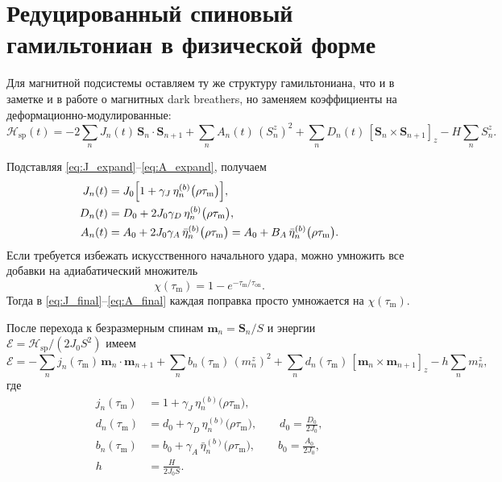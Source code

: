 \documentclass[12pt,a4paper]{article}
\newcommand{\E}{\mathcal{E}}
\newcommand{\Hsp}{\mathcal{H}_{\mathrm{sp}}}
\newcommand{\m}{\bm{m}}
\newcommand{\tm}{\tau_{\mathrm{m}}}
\begin{document}
\section{Редуцированный спиновый гамильтониан в физической форме}
Для магнитной подсистемы оставляем ту же структуру гамильтониана, что и в заметке и в работе о магнитных dark breathers, но заменяем коэффициенты на деформационно-модулированные:
\begin{equation}
\Hsp(t)= -2\sum_n J_n(t)\,\bm S_n\cdot\bm S_{n+1}
+ \sum_n A_n(t)\,(S_n^z)^2
+ \sum_n D_n(t)\,[\bm S_n\times \bm S_{n+1}]_z
- H\sum_n S_n^z.
\label{eq:Hspin_physical}
\end{equation}

Подставляя \eqref{eq:J_expand}--\eqref{eq:A_expand}, получаем
\begin{align}
J_n(t) &= J_0\Bigl[1+\gamma_J\,\eta_n^{(b)}\bigl(\rho\tm\bigr)\Bigr],
\label{eq:J_final}\\
D_n(t) &= D_0 + 2J_0\gamma_D\,\eta_n^{(b)}\bigl(\rho\tm\bigr),
\label{eq:D_final}\\
A_n(t) &= A_0 + 2J_0\gamma_A\,\bar\eta_n^{(b)}\bigl(\rho\tm\bigr)
= A_0 + B_A\,\bar\eta_n^{(b)}\bigl(\rho\tm\bigr).
\label{eq:A_final}
\end{align}
Если требуется избежать искусственного начального удара, можно умножить все добавки на адиабатический множитель
\begin{equation}
\chi(\tm)=1-e^{-\tm/\tau_{\mathrm{on}}}.
\end{equation}
Тогда в \eqref{eq:J_final}--\eqref{eq:A_final} каждая поправка просто умножается на $\chi(\tm)$.

После перехода к безразмерным спинам $\m_n=\bm S_n/S$ и энергии $\E=\Hsp/(2J_0S^2)$ имеем
\begin{equation}
\E = -\sum_n j_n(\tm)\,\m_n\cdot\m_{n+1}
+ \sum_n b_n(\tm)\,(m_n^z)^2
+ \sum_n d_n(\tm)\,[\m_n\times\m_{n+1}]_z
- h\sum_n m_n^z,
\label{eq:E_dimensionless_new}
\end{equation}
где
\begin{align}
j_n(\tm) &= 1+\gamma_J\,\eta_n^{(b)}\bigl(\rho\tm\bigr), \\
d_n(\tm) &= d_0+\gamma_D\,\eta_n^{(b)}\bigl(\rho\tm\bigr),
\qquad d_0=\frac{D_0}{2J_0}, \\
b_n(\tm) &= b_0+\gamma_A\,\bar\eta_n^{(b)}\bigl(\rho\tm\bigr),
\qquad b_0=\frac{A_0}{2J_0}, \\
h&=\frac{H}{2J_0S}.
\end{align}
\end{document}
